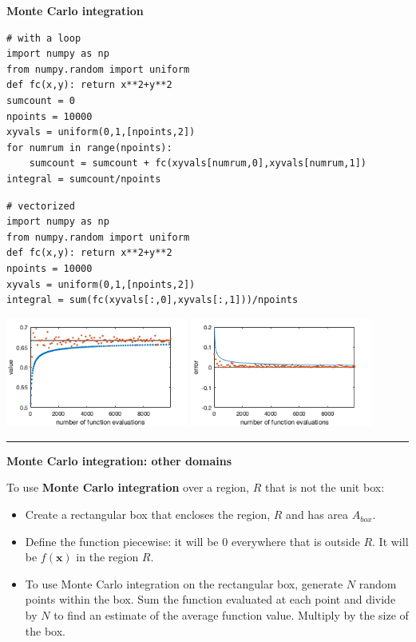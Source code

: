 \documentclass[12pt,letterpaper,noanswers]{exam}
\newcommand{\vc}[1]{\boldsymbol{#1}}
\begin{document}
\noindent\textbf{Monte Carlo integration}

\begin{multicols}{2}
\begin{lstlisting}
# with a loop
import numpy as np
from numpy.random import uniform
def fc(x,y): return x**2+y**2
sumcount = 0
npoints = 10000
xyvals = uniform(0,1,[npoints,2])
for numrum in range(npoints):
    sumcount = sumcount + fc(xyvals[numrum,0],xyvals[numrum,1])
integral = sumcount/npoints
\end{lstlisting}
\columnbreak
\begin{lstlisting}
# vectorized
import numpy as np
from numpy.random import uniform
def fc(x,y): return x**2+y**2
npoints = 10000
xyvals = uniform(0,1,[npoints,2])
integral = sum(fc(xyvals[:,0],xyvals[:,1]))/npoints
\end{lstlisting}
\end{multicols}

\includegraphics[width=0.45\textwidth]{img/C15MC.png}
\includegraphics[width=0.45\textwidth]{img/C15MCerror.png}

\vspace{0.2cm}
\hrule
\vspace{0.2cm}

\noindent\textbf{Monte Carlo integration: other domains}
\begin{tcolorbox}
To use \textbf{Monte Carlo integration} over a region, $R$ that is not the unit box:
\begin{itemize}
\itemsep0em
    \item Create a rectangular box that encloses the region, $R$ and has area $A_{box}$. 
    \item Define the function piecewise: it will be $0$ everywhere that is outside $R$.  It will be $f(\vc{x})$ in the region $R$.
    \item To use Monte Carlo integration on the rectangular box, generate $N$ random points within the box.  Sum the function evaluated at each point and divide by $N$ to find an estimate of the average function value.  Multiply by the size of the box.

\end{itemize}

\end{tcolorbox}
\end{document}
